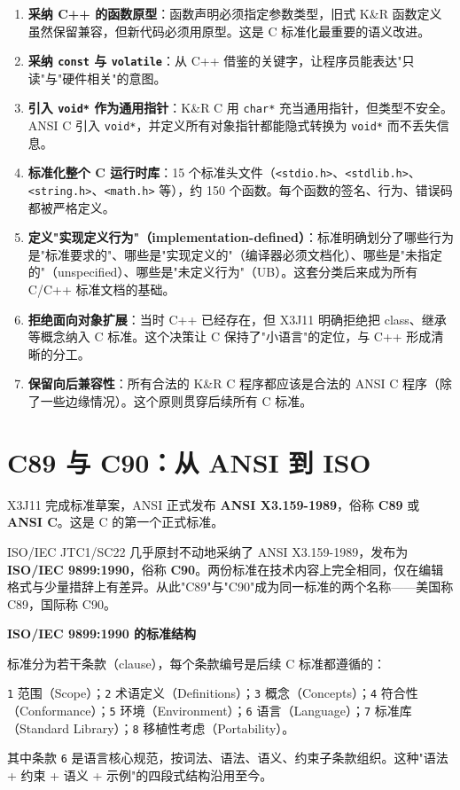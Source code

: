 \documentclass[12pt,a4paper,fontset=fandol]{ctexbook}
\newcommand{\yearlabel}[1]{%
  \tcbox[on line,colback=yearheadbg,colframe=yearheadbg,
    boxrule=0pt,arc=1pt,left=3pt,right=3pt,top=1pt,bottom=1pt,
    colupper=white,fontupper=\scriptsize\bfseries]{#1}}
\newcommand{\kw}[1]{\texttt{#1}}
\newcommand{\yrlbl}[1]{\yearlabel{#1}}
\begin{document}
\begin{enumerate}
  \item \textbf{采纳 C++ 的函数原型}：函数声明必须指定参数类型，旧式 K\&R 函数定义虽然保留兼容，但新代码必须用原型。这是 C 标准化最重要的语义改进。
  \item \textbf{采纳 \kw{const} 与 \kw{volatile}}：从 C++ 借鉴的关键字，让程序员能表达"只读"与"硬件相关"的意图。
  \item \textbf{引入 \kw{void*} 作为通用指针}：K\&R C 用 \kw{char*} 充当通用指针，但类型不安全。ANSI C 引入 \kw{void*}，并定义所有对象指针都能隐式转换为 \kw{void*} 而不丢失信息。
  \item \textbf{标准化整个 C 运行时库}：15 个标准头文件（\texttt{<stdio.h>}、\texttt{<stdlib.h>}、\texttt{<string.h>}、\texttt{<math.h>} 等），约 150 个函数。每个函数的签名、行为、错误码都被严格定义。
  \item \textbf{定义"实现定义行为"（implementation-defined）}：标准明确划分了哪些行为是"标准要求的"、哪些是"实现定义的"（编译器必须文档化）、哪些是"未指定的"（unspecified）、哪些是"未定义行为"（UB）。这套分类后来成为所有 C/C++ 标准文档的基础。
  \item \textbf{拒绝面向对象扩展}：当时 C++ 已经存在，但 X3J11 明确拒绝把 class、继承等概念纳入 C 标准。这个决策让 C 保持了"小语言"的定位，与 C++ 形成清晰的分工。
  \item \textbf{保留向后兼容性}：所有合法的 K\&R C 程序都应该是合法的 ANSI C 程序（除了一些边缘情况）。这个原则贯穿后续所有 C 标准。
\end{enumerate}

\section{C89 与 C90：从 ANSI 到 ISO}

\yrlbl{1989} X3J11 完成标准草案，ANSI 正式发布 \textbf{ANSI X3.159-1989}，俗称 \textbf{C89} 或 \textbf{ANSI C}。这是 C 的第一个正式标准。

\yrlbl{1990} ISO/IEC JTC1/SC22 几乎原封不动地采纳了 ANSI X3.159-1989，发布为 \textbf{ISO/IEC 9899:1990}，俗称 \textbf{C90}。两份标准在技术内容上完全相同，仅在编辑格式与少量措辞上有差异。从此"C89"与"C90"成为同一标准的两个名称——美国称 C89，国际称 C90。

\begin{stdbox}
\textbf{ISO/IEC 9899:1990 的标准结构}

标准分为若干条款（clause），每个条款编号是后续 C 标准都遵循的：

\kw{1} 范围（Scope）；\kw{2} 术语定义（Definitions）；\kw{3} 概念（Concepts）；\kw{4} 符合性（Conformance）；\kw{5} 环境（Environment）；\kw{6} 语言（Language）；\kw{7} 标准库（Standard Library）；\kw{8} 移植性考虑（Portability）。

其中条款 \kw{6} 是语言核心规范，按词法、语法、语义、约束子条款组织。这种"语法 + 约束 + 语义 + 示例"的四段式结构沿用至今。
\end{stdbox}
\end{document}
